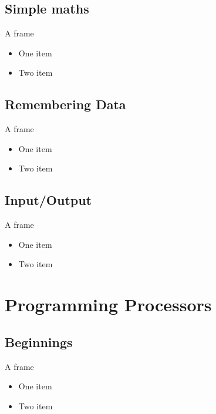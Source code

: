 \documentclass{beamer}
\begin{document}
\subsection[Maths]{Simple maths}

\begin{frame}{A frame}
  \begin{itemize}
  \item
    One item
  \item
    Two item
  \end{itemize}
\end{frame}


\subsection[Memory]{Remembering Data}

\begin{frame}{A frame}
  \begin{itemize}
  \item
    One item
  \item
    Two item
  \end{itemize}
\end{frame}

\subsection[IO]{Input/Output}

\begin{frame}{A frame}
  \begin{itemize}
  \item
    One item
  \item
    Two item
  \end{itemize}
\end{frame}

\section{Programming Processors}

\subsection[Older]{Beginnings}

\begin{frame}{A frame}
  \begin{itemize}
  \item
    One item
  \item
    Two item
  \end{itemize}
\end{frame}
\end{document}
